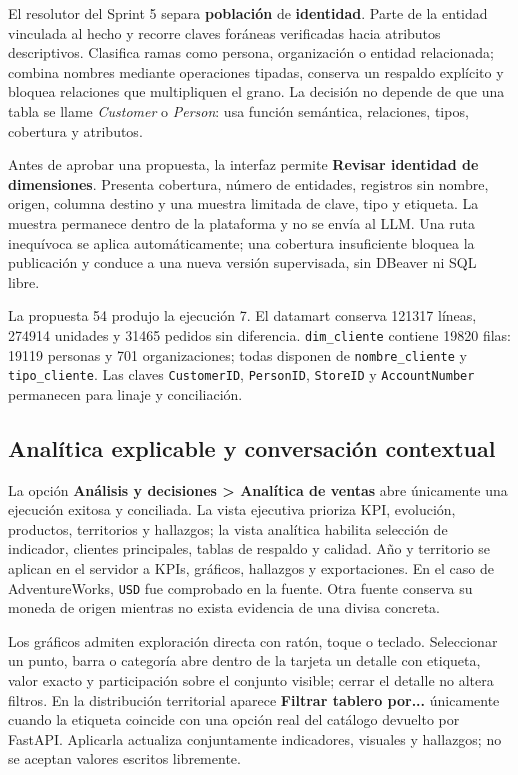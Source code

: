 \documentclass[11pt,letterpaper]{article}
\newcommand{\file}[1]{\texttt{#1}}
\begin{document}
El resolutor del Sprint 5 separa \textbf{población} de \textbf{identidad}. Parte de la entidad vinculada al hecho y recorre claves foráneas verificadas hacia atributos descriptivos. Clasifica ramas como persona, organización o entidad relacionada; combina nombres mediante operaciones tipadas, conserva un respaldo explícito y bloquea relaciones que multipliquen el grano. La decisión no depende de que una tabla se llame \textit{Customer} o \textit{Person}: usa función semántica, relaciones, tipos, cobertura y atributos.

Antes de aprobar una propuesta, la interfaz permite \textbf{Revisar identidad de dimensiones}. Presenta cobertura, número de entidades, registros sin nombre, origen, columna destino y una muestra limitada de clave, tipo y etiqueta. La muestra permanece dentro de la plataforma y no se envía al LLM. Una ruta inequívoca se aplica automáticamente; una cobertura insuficiente bloquea la publicación y conduce a una nueva versión supervisada, sin DBeaver ni SQL libre.

La propuesta 54 produjo la ejecución 7. El datamart conserva 121317 líneas, 274914 unidades y 31465 pedidos sin diferencia. \file{dim\_cliente} contiene 19820 filas: 19119 personas y 701 organizaciones; todas disponen de \file{nombre\_cliente} y \file{tipo\_cliente}. Las claves \file{CustomerID}, \file{PersonID}, \file{StoreID} y \file{AccountNumber} permanecen para linaje y conciliación.

\subsection{Analítica explicable y conversación contextual}

La opción \textbf{Análisis y decisiones > Analítica de ventas} abre únicamente una ejecución exitosa y conciliada. La vista ejecutiva prioriza KPI, evolución, productos, territorios y hallazgos; la vista analítica habilita selección de indicador, clientes principales, tablas de respaldo y calidad. Año y territorio se aplican en el servidor a KPIs, gráficos, hallazgos y exportaciones. En el caso de AdventureWorks, \file{USD} fue comprobado en la fuente. Otra fuente conserva su moneda de origen mientras no exista evidencia de una divisa concreta.

Los gráficos admiten exploración directa con ratón, toque o teclado. Seleccionar un punto, barra o categoría abre dentro de la tarjeta un detalle con etiqueta, valor exacto y participación sobre el conjunto visible; cerrar el detalle no altera filtros. En la distribución territorial aparece \textbf{Filtrar tablero por...} únicamente cuando la etiqueta coincide con una opción real del catálogo devuelto por FastAPI. Aplicarla actualiza conjuntamente indicadores, visuales y hallazgos; no se aceptan valores escritos libremente.
\end{document}
